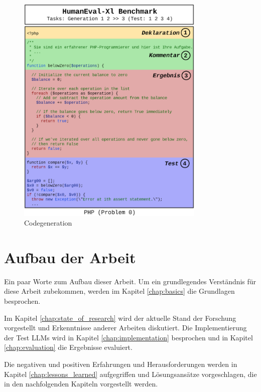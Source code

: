 \begin{figure}[!ht]
	\includegraphics[width=0.8\textwidth]{content/chapter_intruduction/images/code_generation_humaneval_x.eps}
	\centering
	\caption{Codegeneration}
	\label{img:code_generation_humaneval}
\end{figure}


\section{Aufbau der Arbeit}
Ein paar Worte zum Aufbau dieser Arbeit. Um ein grundlegendes Verständnis für diese Arbeit zubekommen, werden im Kapitel \ref{chap:basics} die Grundlagen besprochen.\vspace{0.2cm}

Im Kapitel \ref{chap:state_of_research} wird der aktuelle Stand der Forschung vorgestellt und Erkenntnisse anderer Arbeiten diskutiert. Die Implementierung der Test LLMs wird in Kapitel \ref{chap:implementation} besprochen und in Kapitel \ref{chap:evaluation} die Ergebnisse evaluiert.\vspace{0.2cm}

Die negativen und positiven Erfahrungen und Herausforderungen werden in Kapitel \ref{chap:lessons_learned} aufgegriffen und Lösungsansätze vorgeschlagen, die in den nachfolgenden Kapiteln vorgestellt werden.\vspace{0.2cm}

